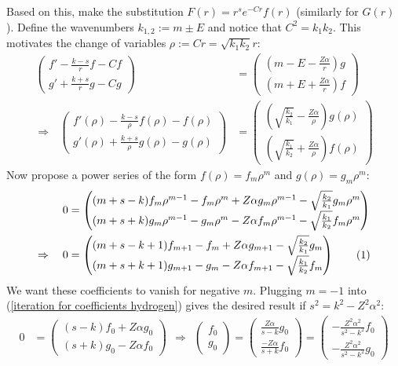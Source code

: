 \documentclass[a4paper,12pt]{article}
\newcommand\numberthis{\addtocounter{equation}{1}\tag{\theequation}}
\begin{document}
Based on this, make the substitution $F(r)=r^se^{-Cr}f(r)$ (similarly for $G(r)$). Define the wavenumbers $k_{1,2}:=m\pm E$ and notice that $C^2=k_1k_2$. This motivates the change of variables $\rho:=Cr=\sqrt{k_1k_2}r$:
\begin{align*}
\begin{pmatrix}
f'-\frac{k-s}{r}f-Cf \\ g'+\frac{k+s}{r}g-Cg
\end{pmatrix}&=\begin{pmatrix}
(m-E-\frac{Z\alpha}{r})g \\ (m+E+\frac{Z\alpha}{r})f
\end{pmatrix}\\
\Rightarrow\ \ \ \begin{pmatrix}
f'(\rho)-\frac{k-s}{\rho}f(\rho)-f(\rho) \\ g'(\rho)+\frac{k+s}{\rho}g(\rho)-g(\rho)
\end{pmatrix}&=\begin{pmatrix}
(\sqrt{\frac{k_2}{k_1}}-\frac{Z\alpha}{\rho})g(\rho) \\ (\sqrt{\frac{k_1}{k_2}}+\frac{Z\alpha}{\rho})f(\rho)
\end{pmatrix}
\end{align*}
Now propose a power series of the form $f(\rho)=f_m\rho^m$ and $g(\rho)=g_m\rho^m$:
\begin{align*}
0&=\begin{pmatrix}
(m+s-k)f_m\rho^{m-1}-f_m\rho^m+Z\alpha g_m\rho^{m-1}-\sqrt{\frac{k_2}{k_1}}g_m\rho^m \\ (m+s+k)g_m\rho^{m-1}-g_m\rho^m-Z\alpha f_m\rho^{m-1}-\sqrt{\frac{k_1}{k_2}}f_m\rho^m
\end{pmatrix}\\
\Rightarrow\ \ \ 0&=\begin{pmatrix}
(m+s-k+1)f_{m+1}-f_m+Z\alpha g_{m+1}-\sqrt{\frac{k_2}{k_1}}g_m \\ (m+s+k+1)g_{m+1}-g_m-Z\alpha f_{m+1}-\sqrt{\frac{k_1}{k_2}}f_m
\end{pmatrix}\numberthis\label{iteration for coefficients hydrogen}
\end{align*}
We want these coefficients to vanish for negative $m$. Plugging $m=-1$ into (\ref{iteration for coefficients hydrogen}) gives the desired result if $s^2=k^2-Z^2\alpha^2$:
\begin{align*}
0&=\begin{pmatrix}
(s-k)f_0+Z\alpha g_0 \\ (s+k)g_0-Z\alpha f_0
\end{pmatrix}\ \ \Rightarrow\ \ \begin{pmatrix}
f_0 \\ g_0
\end{pmatrix}=\begin{pmatrix}
\frac{Z\alpha}{s-k}g_0 \\ \frac{-Z\alpha}{s+k}f_0
\end{pmatrix}=\begin{pmatrix}
-\frac{Z^2\alpha^2}{s^2-k^2}f_0 \\ -\frac{Z^2\alpha^2}{s^2-k^2}g_0
\end{pmatrix}
\end{align*}
\end{document}
